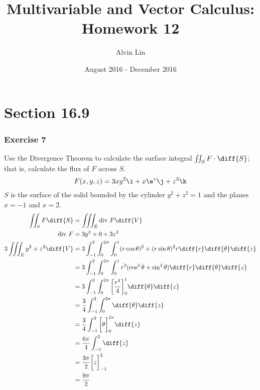 \documentclass{math}
\title{Multivariable and Vector Calculus: Homework 12}
\author{Alvin Lin}
\date{August 2016 - December 2016}
\begin{document}
\maketitle

\section*{Section 16.9}

\subsubsection*{Exercise 7}
Use the Divergence Theorem to calculate the surface integral
\( \iint_{S}F\cdot\diff{S} \); that is, calculate the flux of \( F \) across
\( S \).
\[ F(x,y,z) = 3xy^2\i+x\e^z\j+z^3\k \]
\( S \) is the surface of the solid bounded by the cylinder \( y^2+z^2 = 1 \)
and the planes \( x = -1 \) and \( x = 2 \).
\begin{align*}
  \iint_{S}F\diff{S} &= \iiint_{E}\text{div}~F\diff{V} \\
  \text{div}~F &= 3y^2+0+3z^2 \\
  3\iiint_{E}y^2+z^2\diff{V} &=
    3\int_{-1}^{2}\int_{0}^{2\pi}\int_{0}^{1}(r\cos\theta)^2+(r\sin\theta)^2r
    \diff{r}\diff{\theta}\diff{z} \\
  &= 3\int_{-1}^{2}\int_{0}^{2\pi}\int_{0}^{1}r^3(\cos^2\theta+\sin^2\theta)
    \diff{r}\diff{\theta}\diff{z} \\
  &= 3\int_{-1}^{2}\int_{0}^{2\pi}\bigg[\frac{r^4}{4}\bigg]_{0}^{1}
    \diff{\theta}\diff{z} \\
  &= \frac{3}{4}\int_{-1}^{2}\int_{0}^{2\pi}\diff{\theta}\diff{z} \\
  &= \frac{3}{4}\int_{-1}^{2}\bigg[\theta\bigg]_{0}^{2\pi}\diff{z} \\
  &= \frac{6\pi}{4}\int_{-1}^{2}\diff{z} \\
  &= \frac{3\pi}{2}\bigg[z\bigg]_{-1}^{2} \\
  &= \frac{9\pi}{2}
\end{align*}
\end{document}
